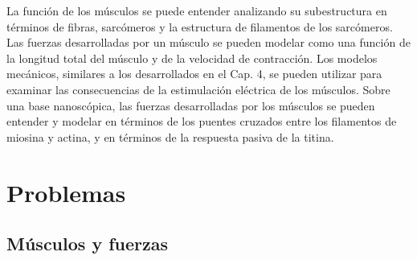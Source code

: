 \documentclass[12pt]{book}
\begin{document}
La función de los músculos se puede entender analizando su subestructura en términos de fibras, sarcómeros y la estructura de filamentos de los sarcómeros. Las fuerzas desarrolladas por un músculo se pueden modelar como una función de la longitud total del músculo y de la velocidad de contracción. Los modelos mecánicos, similares a los desarrollados en el Cap. 4, se pueden utilizar para examinar las consecuencias de la estimulación eléctrica de los músculos. Sobre una base nanoscópica, las fuerzas desarrolladas por los músculos se pueden entender y modelar en términos de los puentes cruzados entre los filamentos de miosina y actina, y en términos de la respuesta pasiva de la titina.

\section*{Problemas}

\subsection*{Músculos y fuerzas}
\end{document}
